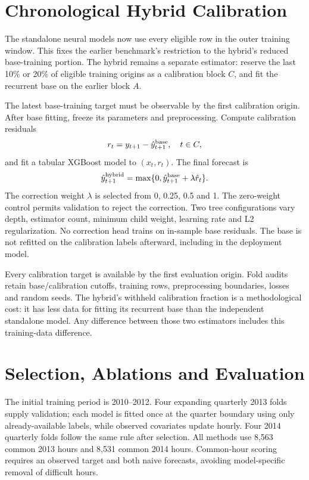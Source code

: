 \documentclass[conference]{IEEEtran}
\begin{document}
\section{Chronological Hybrid Calibration}
The standalone neural models now use every eligible row in the outer training window. This fixes the earlier benchmark's restriction to the hybrid's reduced base-training portion. The hybrid remains a separate estimator: reserve the last 10\% or 20\% of eligible training origins as a calibration block $C$, and fit the recurrent base on the earlier block $A$.

The latest base-training target must be observable by the first calibration origin. After base fitting, freeze its parameters and preprocessing. Compute calibration residuals
\begin{equation}
r_t=y_{t+1}-\hat y^{\rm base}_{t+1},\quad t\in C,
\end{equation}
and fit a tabular XGBoost model to $(x_t,r_t)$. The final forecast is
\begin{equation}
\hat y^{\rm hybrid}_{t+1}=\max\{0,\hat y^{\rm base}_{t+1}+\lambda\hat r_t\}.
\end{equation}
The correction weight $\lambda$ is selected from 0, 0.25, 0.5 and 1. The zero-weight control permits validation to reject the correction. Two tree configurations vary depth, estimator count, minimum child weight, learning rate and L2 regularization. No correction head trains on in-sample base residuals. The base is not refitted on the calibration labels afterward, including in the deployment model.

Every calibration target is available by the first evaluation origin. Fold audits retain base/calibration cutoffs, training rows, preprocessing boundaries, losses and random seeds. The hybrid's withheld calibration fraction is a methodological cost: it has less data for fitting its recurrent base than the independent standalone model. Any difference between those two estimators includes this training-data difference.

\section{Selection, Ablations and Evaluation}
The initial training period is 2010--2012. Four expanding quarterly 2013 folds supply validation; each model is fitted once at the quarter boundary using only already-available labels, while observed covariates update hourly. Four 2014 quarterly folds follow the same rule after selection. All methods use 8,563 common 2013 hours and 8,531 common 2014 hours. Common-hour scoring requires an observed target and both naive forecasts, avoiding model-specific removal of difficult hours.
\end{document}
